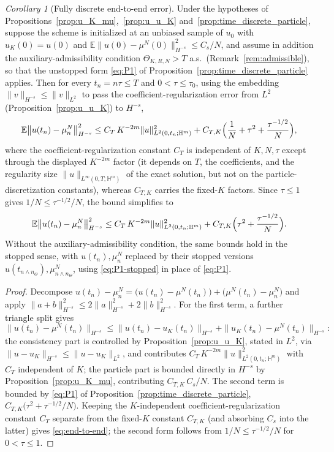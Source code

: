 \documentclass[a4paper,fleqn]{cas-sc}
\theoremstyle{definition}
\theoremstyle{remark}
\newtheorem{corollary}{Corollary}
\begin{document}
\begin{corollary}[Fully discrete end-to-end error]\label{cor:end-to-end}
Under the hypotheses of Propositions~\ref{prop:u_K_mu},~\ref{prop:u_u_K}
and~\ref{prop:time_discrete_particle}, suppose the scheme is initialized at an
unbiased sample of $u_0$ with $u_K(0)=u(0)$ and
$\mathbb E\|u(0)-\mu^N(0)\|_{H^{-s}}^2\le C_s/N$, and assume in addition the
auxiliary-admissibility condition $\Theta_{K,R,N}>T$ a.s.\
(Remark~\ref{rem:admissible}), so that the
unstopped form \eqref{eq:P1} of
Proposition~\ref{prop:time_discrete_particle} applies. Then for every $t_n=n\tau\le T$ and
$0<\tau\le\tau_0$, using the embedding $\|v\|_{H^{-s}}\le\|v\|_{L^2}$ to pass the
coefficient-regularization error from $L^2$ (Proposition~\ref{prop:u_u_K}) to $H^{-s}$,
\begin{equation}\label{eq:end-to-end}
\mathbb E\bigl\|u(t_n)-\mu^N_n\bigr\|_{H^{-s}}^2
\le C_T\,K^{-2m}\|u\|_{L^2(0,t_n;\mathbb H^m)}^2
+C_{T,K}\Bigl(\frac1N+\tau^2+\frac{\tau^{-1/2}}{N}\Bigr),
\end{equation}
where the coefficient-regularization constant $C_T$ is independent of $K,N,\tau$
except through the displayed $K^{-2m}$ factor (it depends on $T$, the coefficients,
and the regularity size $\|u\|_{L^\infty(0,T;\mathbb H^m)}$ of the exact solution, but
not on the particle-discretization constants), whereas $C_{T,K}$ carries the fixed-$K$
factors. Since $\tau\le1$ gives
$1/N\le\tau^{-1/2}/N$, the bound simplifies to
\[
\mathbb E\bigl\|u(t_n)-\mu^N_n\bigr\|_{H^{-s}}^2
\le C_T\,K^{-2m}\|u\|_{L^2(0,t_n;\mathbb H^m)}^2
+C_{T,K}\Bigl(\tau^2+\frac{\tau^{-1/2}}{N}\Bigr).
\]
Without the auxiliary-admissibility condition, the same bounds hold in the stopped
sense, with $u(t_n),\mu^N_n$ replaced by their stopped versions
$u(t_{n\wedge n_\Theta}),\mu^N_{n\wedge n_\Theta}$, using \eqref{eq:P1-stopped} in
place of \eqref{eq:P1}.
\end{corollary}

\begin{proof}
Decompose $u(t_n)-\mu^N_n=\bigl(u(t_n)-\mu^N(t_n)\bigr)+\bigl(\mu^N(t_n)-\mu^N_n\bigr)$
and apply $\|a+b\|_{H^{-s}}^2\le2\|a\|_{H^{-s}}^2+2\|b\|_{H^{-s}}^2$. For the first
term, a further triangle split gives
\[
\|u(t_n)-\mu^N(t_n)\|_{H^{-s}}\le\|u(t_n)-u_K(t_n)\|_{H^{-s}}+\|u_K(t_n)-\mu^N(t_n)\|_{H^{-s}}:
\]
the consistency part is controlled by Proposition~\ref{prop:u_u_K}, stated in
$L^2$, via $\|u-u_K\|_{H^{-s}}\le\|u-u_K\|_{L^2}$, and contributes
$C_T\,K^{-2m}\|u\|_{L^2(0,t_n;\mathbb H^m)}^2$ with $C_T$ independent of $K$; the
particle part is bounded directly in $H^{-s}$ by Proposition~\ref{prop:u_K_mu},
contributing $C_{T,K}\,C_s/N$. The second term is bounded by \eqref{eq:P1} of
Proposition~\ref{prop:time_discrete_particle},
$C_{T,K}\bigl(\tau^2+\tau^{-1/2}/N\bigr)$. Keeping the $K$-independent
coefficient-regularization constant $C_T$ separate from the fixed-$K$ constant
$C_{T,K}$ (and absorbing $C_s$ into the latter) gives \eqref{eq:end-to-end}; the
second form follows from $1/N\le\tau^{-1/2}/N$ for $0<\tau\le1$.
\end{proof}
\end{document}
